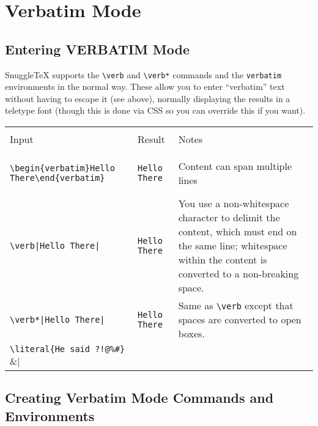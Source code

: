 
\section*{Verbatim Mode}

\newenvironment{ndemotable}
{\begin{center}
 \begin{tabular}{|l|l|l|}
 \hline \\
 Input & Result & Notes \\
 \hline \\
}{\hline
 \end{tabular}
 \end{center}
}

\subsection*{Entering VERBATIM Mode}

SnuggleTeX supports the \verb|\verb| and \verb|\verb*| commands and the
\texttt{verbatim} environments in the normal way. These allow you to
enter ``verbatim'' text without having to escape it (see above), normally
displaying the results in a teletype font (though this is done via CSS
so you can override this if you want).

\begin{ndemotable}
\verb|\begin{verbatim}Hello There\end{verbatim}| &
\begin{verbatim}Hello There\end{verbatim} &
Content can span multiple lines \\
\hline
\verb!\verb|Hello There|! &
\verb|Hello There| &
You use a non-whitespace character to delimit the content,
which must end on the same line; whitespace within
the content is converted to a non-breaking space. \\
\hline
\verb!\verb*|Hello There|! &
\verb*|Hello There| &
Same as \verb|\verb| except that spaces are converted
to open boxes. \\
\hline
\verb|\literal{He said ?!@%#}| &
\literal{He said ?!@%
This is specific to SnuggleTeX; it lets you enter
text without escaping but displays it as normal. \\
\end{ndemotable}

\subsection*{Creating Verbatim Mode Commands and Environments}

